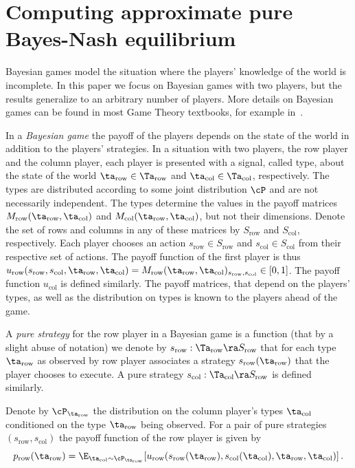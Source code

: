 \section{Computing approximate pure Bayes-Nash equilibrium}
\label{sec:bayes}

Bayesian games model the situation where the players' knowledge of the
world is incomplete.  In this paper we focus on Bayesian games
with two players, but the results generalize to an arbitrary number of
players. More details on Bayesian games can be found in most Game
Theory textbooks, for example in~\cite{FudenbergTirole}.

In a \emph{Bayesian game} the payoff of the players depends on the
state of the world in addition to the players' strategies. In a
situation with two players, the row player and the column player, each player is presented with
a signal, called type, about the state of the world $\ta_{\mathrm{row}}\in \Ta_{\mathrm{row}}$
and $\ta_\mathrm{col}\in\Ta_\mathrm{col}$, respectively.  The types are distributed
according to some joint distribution $\cP$ and are not necessarily
independent. The types determine the values in the payoff matrices $M_{\mathrm{row}}(\ta_{\mathrm{row}},\ta_\mathrm{col})$ and $M_\mathrm{col}(\ta_{\mathrm{row}},\ta_\mathrm{col})$, but not their dimensions. Denote 
the set of rows and columns in any of these matrices by $S_{\mathrm{row}}$ and $S_\mathrm{col}$, respectively.
 Each player chooses an action $s_{\mathrm{row}}\in S_{\mathrm{row}}$ and $s_\mathrm{col}\in
S_\mathrm{col}$ from their respective set of actions.
The payoff function of the first player is thus $u_{\mathrm{row}}(s_{\mathrm{row}},s_\mathrm{col},\ta_{\mathrm{row}},\ta_\mathrm{col})=M_{\mathrm{row}}(\ta_{\mathrm{row}},\ta_\mathrm{col})_{s_{\mathrm{row}},s_\mathrm{col}}\in
[0,1]$. The payoff function $u_\mathrm{col}$ is defined similarly.
The payoff matrices, that depend on the players' types, as well as the distribution on types is known to the players
ahead of the game. 

A \emph{pure strategy} for the row player  in a Bayesian game is a function (that by a slight abuse of notation) we denote 
by $s_{\mathrm{row}}:\Ta_{\mathrm{row}}\ra S_{\mathrm{row}}$ that for each type $\ta_{\mathrm{row}}$ as observed by row player associates a strategy $s_{\mathrm{row}}(\ta_{\mathrm{row}})$
that the player chooses to execute. A pure strategy $s_\mathrm{col}:\Ta_\mathrm{col}\ra S_{\mathrm{row}}$ is defined similarly. 

Denote by $\cP_{\ta_{\mathrm{row}}}$ the distribution on the column player's types $\ta_\mathrm{col}$ conditioned on the type $\ta_{\mathrm{row}}$ being observed. 
For a pair of pure strategies $(s_{\mathrm{row}},s_\mathrm{col})$ the payoff function of the row player  is given by 
$$
p_{\mathrm{row}}(\ta_{\mathrm{row}}) = \E_{\ta_\mathrm{col}\sim \cP_{\ta_{\mathrm{row}}}} [ u_{\mathrm{row}} ( s_{\mathrm{row}}(\ta_{\mathrm{row}}), s_\mathrm{col}(\ta_\mathrm{col}), \ta_{\mathrm{row}}, \ta_\mathrm{col})]\,. 
$$

